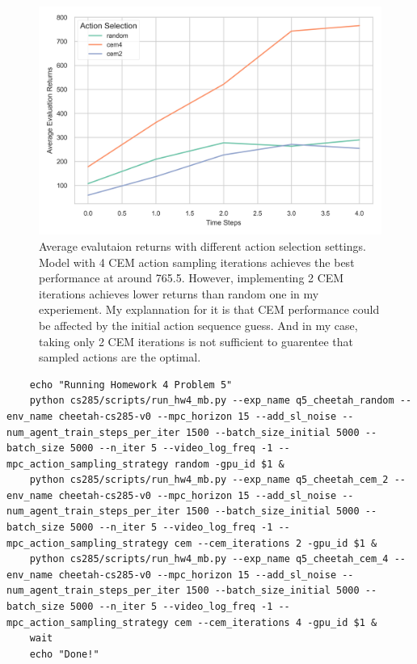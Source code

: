 \documentclass[10pt, letterpaper]{article}
\begin{document}
\begin{figure}[thbp]
    \centering
    \includegraphics[width=\textwidth]{q5.png}
    \caption{Average evalutaion returns with different action selection settings. Model with 4 CEM action sampling iterations achieves the best performance at around 765.5. However, implementing 2 CEM iterations achieves lower returns than random one in my experiement. My explannation for it is that CEM performance could be affected by the initial action sequence guess. And in my case, taking only 2 CEM iterations is not sufficient to guarentee that sampled actions are the optimal.}
    \label{fig:5}
\end{figure}

\begin{lstlisting}
    echo "Running Homework 4 Problem 5"
    python cs285/scripts/run_hw4_mb.py --exp_name q5_cheetah_random --env_name cheetah-cs285-v0 --mpc_horizon 15 --add_sl_noise --num_agent_train_steps_per_iter 1500 --batch_size_initial 5000 --batch_size 5000 --n_iter 5 --video_log_freq -1 --mpc_action_sampling_strategy random -gpu_id $1 &
    python cs285/scripts/run_hw4_mb.py --exp_name q5_cheetah_cem_2 --env_name cheetah-cs285-v0 --mpc_horizon 15 --add_sl_noise --num_agent_train_steps_per_iter 1500 --batch_size_initial 5000 --batch_size 5000 --n_iter 5 --video_log_freq -1 --mpc_action_sampling_strategy cem --cem_iterations 2 -gpu_id $1 &
    python cs285/scripts/run_hw4_mb.py --exp_name q5_cheetah_cem_4 --env_name cheetah-cs285-v0 --mpc_horizon 15 --add_sl_noise --num_agent_train_steps_per_iter 1500 --batch_size_initial 5000 --batch_size 5000 --n_iter 5 --video_log_freq -1 --mpc_action_sampling_strategy cem --cem_iterations 4 -gpu_id $1 &
    wait
    echo "Done!"
\end{lstlisting}
\end{document}
